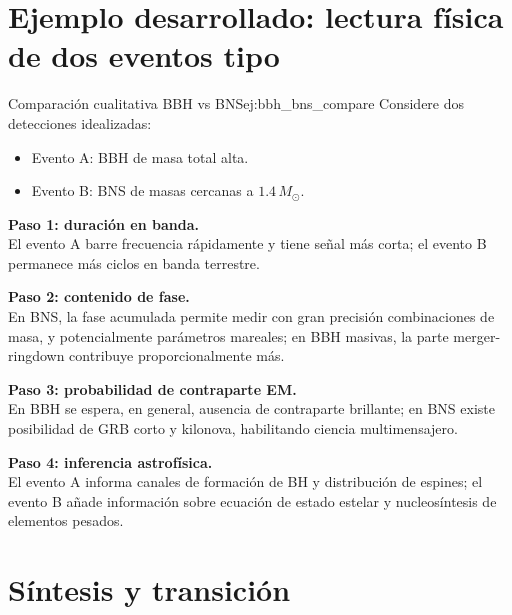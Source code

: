 \section{Ejemplo desarrollado: lectura física de dos eventos tipo}
\label{sec:ejemplo_eventos_tipo}

\begin{ejemplo}{Comparación cualitativa BBH vs BNS}{ej:bbh_bns_compare}
Considere dos detecciones idealizadas:
\begin{itemize}[leftmargin=2em]
  \item Evento A: BBH de masa total alta.
  \item Evento B: BNS de masas cercanas a $1.4\,M_\odot$.
\end{itemize}

\textbf{Paso 1: duración en banda.} \\
El evento A barre frecuencia rápidamente y tiene señal más corta; el evento B permanece más ciclos en banda terrestre.

\textbf{Paso 2: contenido de fase.} \\
En BNS, la fase acumulada permite medir con gran precisión combinaciones de masa, y potencialmente parámetros mareales; en BBH masivas, la parte merger-ringdown contribuye proporcionalmente más.

\textbf{Paso 3: probabilidad de contraparte EM.} \\
En BBH se espera, en general, ausencia de contraparte brillante; en BNS existe posibilidad de GRB corto y kilonova, habilitando ciencia multimensajero.

\textbf{Paso 4: inferencia astrofísica.} \\
El evento A informa canales de formación de BH y distribución de espines; el evento B añade información sobre ecuación de estado estelar y nucleosíntesis de elementos pesados.
\end{ejemplo}

\section{Síntesis y transición}
\label{sec:sintesis_cap17}

